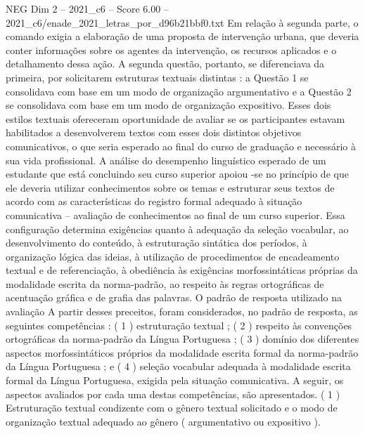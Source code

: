 \begin{textsample}{NEG Dim 2 – 2021\_c6 – Score 6.00 – 2021\_c6/enade\_2021\_letras\_por\_d96b21bbf0.txt}
Em relação à segunda parte, o comando exigia a elaboração de uma proposta de intervenção urbana, que deveria conter informações sobre os agentes da intervenção, os recursos aplicados e o detalhamento dessa ação.
A segunda questão, portanto, se diferenciava da primeira, por solicitarem estruturas textuais distintas : a Questão 1 se consolidava com base em um modo de organização argumentativo e a Questão 2 se consolidava com base em um modo de organização expositivo.
Esses dois estilos textuais ofereceram oportunidade de avaliar se os participantes estavam habilitados a desenvolverem textos com esses dois distintos objetivos comunicativos, o que seria esperado ao final do curso de graduação e necessário à sua vida profissional.
A análise do desempenho linguístico esperado de um estudante que está concluindo seu curso superior apoiou -se no princípio de que ele deveria utilizar conhecimentos sobre os temas e estruturar seus textos de acordo com as características do registro formal adequado à situação comunicativa – avaliação de conhecimentos ao final de um curso superior.
Essa configuração determina exigências quanto à adequação da seleção vocabular, ao desenvolvimento do conteúdo, à estruturação sintática dos períodos, à organização lógica das ideias, à utilização de procedimentos de encadeamento textual e de referenciação, à obediência às exigências morfossintáticas próprias da modalidade escrita da norma-padrão, ao respeito às regras ortográficas de acentuação gráfica e de grafia das palavras.
O padrão de resposta utilizado na avaliação A partir desses preceitos, foram considerados, no padrão de resposta, as seguintes competências : ( 1 ) estruturação textual ; ( 2 ) respeito às convenções ortográficas da norma-padrão da Língua Portuguesa ; ( 3 ) domínio dos diferentes aspectos morfossintáticos próprios da modalidade escrita formal da norma-padrão da Língua Portuguesa ; e ( 4 ) seleção vocabular adequada à modalidade escrita formal da Língua Portuguesa, exigida pela situação comunicativa.
A seguir, os aspectos avaliados por cada uma destas competências, são apresentados. ( 1 ) Estruturação textual condizente com o gênero textual solicitado e o modo de organização textual adequado ao gênero ( argumentativo ou expositivo ).

\end{textsample}
